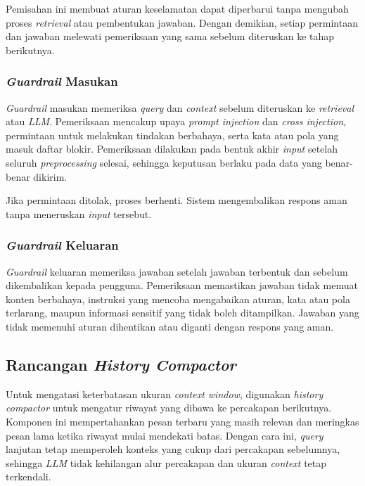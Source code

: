 Pemisahan ini membuat aturan keselamatan dapat diperbarui tanpa mengubah proses
\emph{retrieval} atau pembentukan jawaban. Dengan demikian, setiap permintaan dan
jawaban melewati pemeriksaan yang sama sebelum diteruskan ke tahap berikutnya.

\subsubsection{\emph{Guardrail} Masukan}
\label{subsubsec:guardrail-input}

\emph{Guardrail} masukan memeriksa \emph{query} dan \emph{context} sebelum diteruskan
ke \emph{retrieval} atau \emph{LLM}. Pemeriksaan mencakup upaya \emph{prompt injection} dan
\emph{cross injection}, permintaan untuk melakukan tindakan berbahaya, serta kata atau pola
yang masuk daftar blokir. Pemeriksaan dilakukan pada bentuk akhir \emph{input} setelah
seluruh \emph{preprocessing} selesai, sehingga keputusan berlaku pada data yang benar-benar
dikirim.

Jika permintaan ditolak, proses berhenti. Sistem mengembalikan respons aman tanpa
meneruskan \emph{input} tersebut.

\subsubsection{\emph{Guardrail} Keluaran}
\label{subsubsec:guardrail-output}

\emph{Guardrail} keluaran memeriksa jawaban setelah jawaban terbentuk dan sebelum
dikembalikan kepada pengguna. Pemeriksaan memastikan jawaban tidak memuat konten
berbahaya, instruksi yang mencoba mengabaikan aturan, kata atau pola terlarang, maupun
informasi sensitif yang tidak boleh ditampilkan. Jawaban yang tidak memenuhi aturan
dihentikan atau diganti dengan respons yang aman.
\subsection{Rancangan \emph{History Compactor}}
\label{subsec:solusi-history-compactor}

Untuk mengatasi keterbatasan ukuran \emph{context window}, digunakan \emph{history
compactor} untuk mengatur riwayat yang dibawa ke percakapan berikutnya. Komponen ini
mempertahankan pesan terbaru yang masih relevan dan meringkas pesan lama ketika riwayat
mulai mendekati batas. Dengan cara ini, \emph{query} lanjutan tetap memperoleh konteks
yang cukup dari percakapan sebelumnya, sehingga \emph{LLM} tidak kehilangan alur percakapan
dan ukuran \emph{context} tetap terkendali.

